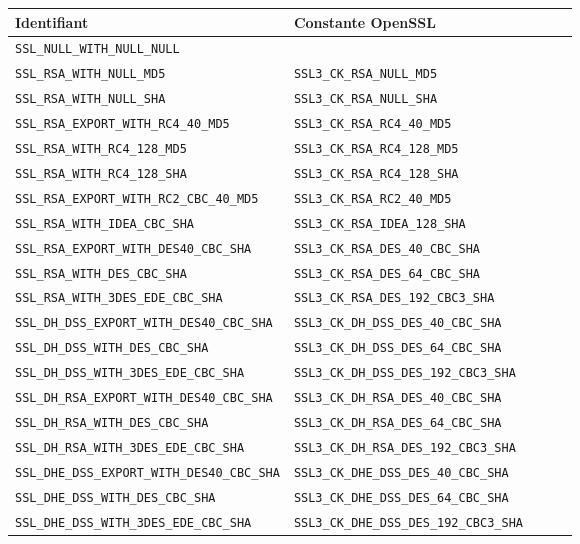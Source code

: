 \documentclass[a4paper,11pt,french]{article}
\begin{document}
\begin{center}
\begin{tabularx}{17cm}{|l|X|l|X|l|}
\hline
\textbf{Identifiant} & \textbf{Constante OpenSSL} \\
\hline
\verb+SSL_NULL_WITH_NULL_NULL+&\\
\hline
\verb+SSL_RSA_WITH_NULL_MD5+&\verb+SSL3_CK_RSA_NULL_MD5+\\
\hline 
\verb+SSL_RSA_WITH_NULL_SHA+&\verb+SSL3_CK_RSA_NULL_SHA+\\
\hline 
\verb+SSL_RSA_EXPORT_WITH_RC4_40_MD5+&\verb+SSL3_CK_RSA_RC4_40_MD5+\\
\hline
\verb+SSL_RSA_WITH_RC4_128_MD5+&\verb+SSL3_CK_RSA_RC4_128_MD5+\\
\hline
\verb+SSL_RSA_WITH_RC4_128_SHA+ &\verb+SSL3_CK_RSA_RC4_128_SHA+\\
\hline
\verb+SSL_RSA_EXPORT_WITH_RC2_CBC_40_MD5+&\verb+SSL3_CK_RSA_RC2_40_MD5+ \\
\hline
\verb+SSL_RSA_WITH_IDEA_CBC_SHA+& \verb+SSL3_CK_RSA_IDEA_128_SHA+\\
\hline
\verb+SSL_RSA_EXPORT_WITH_DES40_CBC_SHA+&\verb+SSL3_CK_RSA_DES_40_CBC_SHA+\\
\hline
\verb+SSL_RSA_WITH_DES_CBC_SHA+& \verb+SSL3_CK_RSA_DES_64_CBC_SHA+\\
\hline
\verb+SSL_RSA_WITH_3DES_EDE_CBC_SHA+& \verb+SSL3_CK_RSA_DES_192_CBC3_SHA+\\
\hline
\verb+SSL_DH_DSS_EXPORT_WITH_DES40_CBC_SHA+&\verb+SSL3_CK_DH_DSS_DES_40_CBC_SHA+\\
\hline
\verb+SSL_DH_DSS_WITH_DES_CBC_SHA+ & \verb+SSL3_CK_DH_DSS_DES_64_CBC_SHA+\\
\hline 
\verb+SSL_DH_DSS_WITH_3DES_EDE_CBC_SHA+ & \verb+SSL3_CK_DH_DSS_DES_192_CBC3_SHA+\\
\hline
\verb+SSL_DH_RSA_EXPORT_WITH_DES40_CBC_SHA+ & \verb+SSL3_CK_DH_RSA_DES_40_CBC_SHA+\\
\hline
\verb+SSL_DH_RSA_WITH_DES_CBC_SHA+ & \verb+SSL3_CK_DH_RSA_DES_64_CBC_SHA+\\
\hline
\verb+SSL_DH_RSA_WITH_3DES_EDE_CBC_SHA+ & \verb+SSL3_CK_DH_RSA_DES_192_CBC3_SHA+\\
\hline
\verb+SSL_DHE_DSS_EXPORT_WITH_DES40_CBC_SHA+ & \verb+SSL3_CK_DHE_DSS_DES_40_CBC_SHA+\\
\hline
\verb+SSL_DHE_DSS_WITH_DES_CBC_SHA+ & \verb+SSL3_CK_DHE_DSS_DES_64_CBC_SHA+\\
\hline
\verb+SSL_DHE_DSS_WITH_3DES_EDE_CBC_SHA+ & \verb+SSL3_CK_DHE_DSS_DES_192_CBC3_SHA+\\

\end{tabularx}
\end{center}
\end{document}
